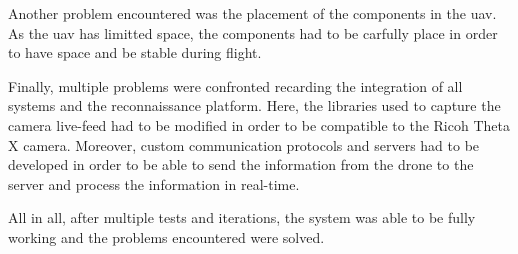 Another problem encountered was the placement of the components in the \gls{uav}. As the \gls{uav} has limitted space, the components had to be carfully place in order to have space and be stable during flight.

Finally, multiple problems were confronted recarding the integration of all systems and the reconnaissance platform. Here, the libraries used to capture the camera live-feed had to be modified in order to be compatible to the Ricoh Theta X camera. Moreover, custom communication protocols and servers had to be developed in order to be able to send the information from the drone to the server and process the information in real-time.

All in all, after multiple tests and iterations, the system was able to be fully working and the problems encountered were solved.


